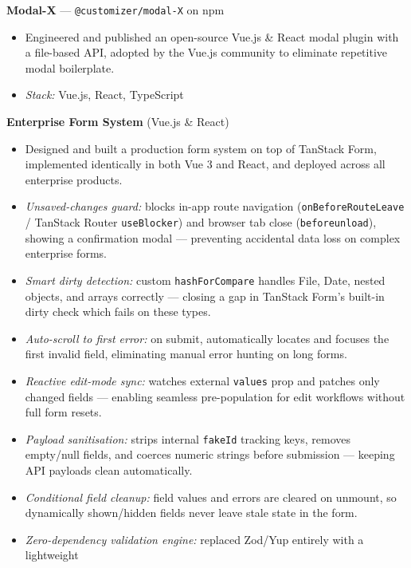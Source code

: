 \documentclass[10pt,a4paper]{article}
\begin{document}
\vspace{4pt}
\textbf{Modal-X} --- \texttt{@customizer/modal-X} on npm
\begin{itemize}
  \item Engineered and published an open-source Vue.js \& React modal plugin with a file-based API,
        adopted by the Vue.js community to eliminate repetitive modal boilerplate.
  \item \textit{Stack:} Vue.js, React, TypeScript
\end{itemize}

\vspace{4pt}
\textbf{Enterprise Form System} (Vue.js \& React)
\begin{itemize}
  \item Designed and built a production form system on top of TanStack Form, implemented identically
        in both Vue 3 and React, and deployed across all enterprise products.
  \item \textit{Unsaved-changes guard:} blocks in-app route navigation
        (\texttt{onBeforeRouteLeave} / TanStack Router \texttt{useBlocker}) and browser tab close
        (\texttt{beforeunload}), showing a confirmation modal --- preventing accidental data loss on
        complex enterprise forms.
  \item \textit{Smart dirty detection:} custom \texttt{hashForCompare} handles File, Date, nested
        objects, and arrays correctly --- closing a gap in TanStack Form's built-in dirty check which
        fails on these types.
  \item \textit{Auto-scroll to first error:} on submit, automatically locates and focuses the first
        invalid field, eliminating manual error hunting on long forms.
  \item \textit{Reactive edit-mode sync:} watches external \texttt{values} prop and patches only
        changed fields --- enabling seamless pre-population for edit workflows without full form resets.
  \item \textit{Payload sanitisation:} strips internal \texttt{fakeId} tracking keys, removes
        empty/null fields, and coerces numeric strings before submission --- keeping API payloads
        clean automatically.
  \item \textit{Conditional field cleanup:} field values and errors are cleared on unmount, so
        dynamically shown/hidden fields never leave stale state in the form.
  \item \textit{Zero-dependency validation engine:} replaced Zod/Yup entirely with a lightweight

\end{itemize}
\end{document}
